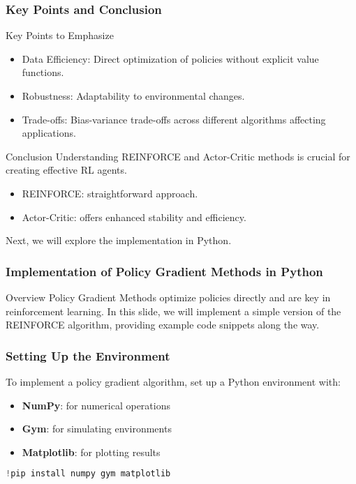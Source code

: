\documentclass[aspectratio=169]{beamer}
\begin{document}
\begin{frame}[fragile]
    \frametitle{Key Points and Conclusion}
    \begin{block}{Key Points to Emphasize}
        \begin{itemize}
            \item Data Efficiency: Direct optimization of policies without explicit value functions.
            \item Robustness: Adaptability to environmental changes.
            \item Trade-offs: Bias-variance trade-offs across different algorithms affecting applications.
        \end{itemize}
    \end{block}

    \begin{block}{Conclusion}
        Understanding REINFORCE and Actor-Critic methods is crucial for creating effective RL agents. 
        \begin{itemize}
            \item REINFORCE: straightforward approach.
            \item Actor-Critic: offers enhanced stability and efficiency.
        \end{itemize}
        Next, we will explore the implementation in Python.
    \end{block}
\end{frame}

\begin{frame}
    \frametitle{Implementation of Policy Gradient Methods in Python}
    \begin{block}{Overview}
        Policy Gradient Methods optimize policies directly and are key in reinforcement learning. In this slide, we will implement a simple version of the REINFORCE algorithm, providing example code snippets along the way.
    \end{block}
\end{frame}

\begin{frame}
    \frametitle{Setting Up the Environment}
    To implement a policy gradient algorithm, set up a Python environment with:
    \begin{itemize}
        \item \textbf{NumPy}: for numerical operations
        \item \textbf{Gym}: for simulating environments
        \item \textbf{Matplotlib}: for plotting results
    \end{itemize}
    \begin{lstlisting}[language=python]
!pip install numpy gym matplotlib
    \end{lstlisting}
\end{frame}
\end{document}
